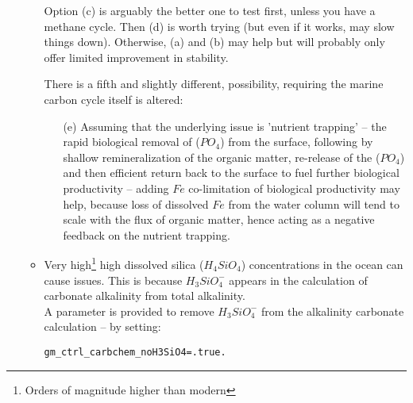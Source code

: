 \documentclass[11pt,fleqn]{book} %
\begin{document}
\begin{enumerate}[noitemsep]
\begin{itemize}[noitemsep]
\begin{enumerate}[noitemsep]
\end{enumerate}
\vspace{1mm}

Option (c) is arguably the better one to test first, unless you have a methane cycle. Then (d) is worth trying (but even if it works, may slow things down). Otherwise, (a) and (b) may help but will probably only offer limited improvement in stability.

\vspace{1mm}

There is a fifth and slightly different, possibility, requiring the marine carbon cycle itself is altered:

\begin{enumerate}[noitemsep]
\vspace{1mm}
\item[(e)] Assuming that the underlying issue is 'nutrient trapping' -- the rapid biological removal of (\(PO_{4}\)) from the surface, following by shallow remineralization of the organic matter, re-release of the (\(PO_{4}\)) and then efficient return back to the surface to fuel further biological productivity -- adding \(Fe\) co-limitation of biological productivity may help, because loss of dissolved \(Fe\) from the water column will tend to scale with the flux of organic matter, hence acting as a negative feedback on the nutrient trapping. 
\end{enumerate}

\vspace{2mm}
\item Very high\footnote{Orders of magnitude higher than modern} high dissolved silica (\(H_{4}SiO_{4}\)) concentrations in the ocean can cause issues. This is because \(H_{3}SiO^{-}_{4}\) appears in the calculation of carbonate alkalinity from total alkalinity.
\\A parameter is provided to remove \(H_{3}SiO^{-}_{4}\) from the alkalinity carbonate calculation -- by setting:
\vspace{-1pt}\small\begin{verbatim}
gm_ctrl_carbchem_noH3SiO4=.true.
\end{verbatim}\normalsize\vspace{-1pt}

\end{itemize}

\end{enumerate}

%
\newpage
\end{document}
